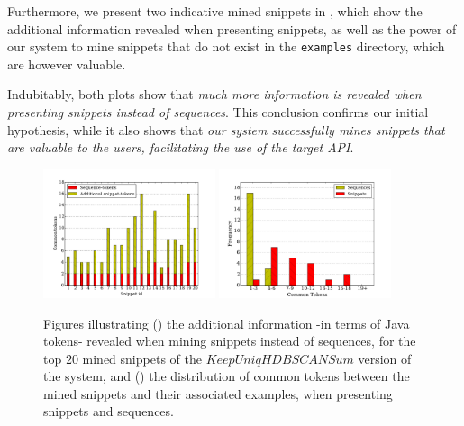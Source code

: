 Furthermore, we present two indicative mined snippets in , which show the additional information revealed when presenting snippets, as well as the power of our system to mine snippets that do not exist in the \texttt{examples} directory, which are however valuable.

Indubitably, both plots show that \textit{much more information is revealed when presenting snippets instead of sequences}. This conclusion confirms our initial hypothesis, while it also shows that \textit{our system successfully mines snippets that are valuable to the users, facilitating the use of the target API}.   

\begin{figure}[t]
\ffigbox
{%
  \begin{subfloatrow}[2]
  \ffigbox[\FBwidth]
    {\caption{}\label{res:exp5-additional-info}}
    {\includegraphics[width=0.45\textwidth]{results/exp5-additional-info.pdf}}
  \hspace{1em}%
  \ffigbox[\FBwidth]
    {\caption{}\label{res:exp5-common-tokens}}
    {\includegraphics[width=0.45\textwidth]{results/exp5-common-tokens.pdf}}
  \end{subfloatrow}}
  {\caption[Illustration of the additional information revealed when mining snippets instead of sequences]{Figures illustrating () the additional information -in terms of Java tokens- revealed when mining snippets instead of sequences, for the top $20$ mined snippets of the $KeepUniqHDBSCANSum$ version of the system, and () the distribution of common tokens between the mined snippets and their associated examples, when presenting snippets and sequences.}
\label{res:exp5-addit-tokens}}
\end{figure}